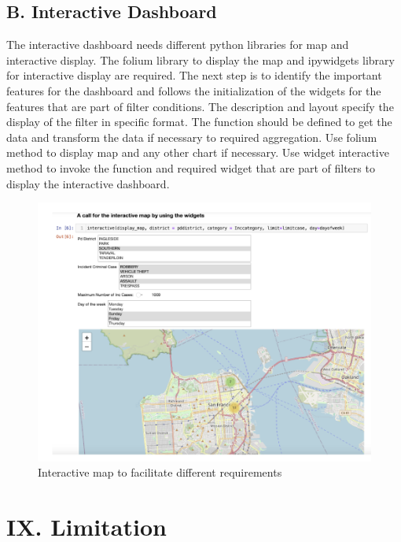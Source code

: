 \documentclass[conference,final, 10pt]{IEEEtran}
\begin{document}
\subsection{B. Interactive Dashboard}\label{b.-interactive-dashboard}

The interactive dashboard needs different python libraries for map and
interactive display. The folium library to display the map and
ipywidgets library for interactive display are required. The next step
is to identify the important features for the dashboard and follows the
initialization of the widgets for the features that are part of filter
conditions. The description and layout specify the display of the filter
in specific format. The function should be defined to get the data and
transform the data if necessary to required aggregation. Use folium
method to display map and any other chart if necessary. Use widget
interactive method to invoke the function and required widget that are
part of filters to display the interactive dashboard.

\begin{figure}

{\centering \includegraphics[width=0.95\linewidth]{img/fig14b} 

}

\caption{Interactive map to facilitate different requirements}\label{fig:unnamed-chunk-19}
\end{figure}

\section{IX. Limitation}\label{ix.-limitation}
\end{document}
